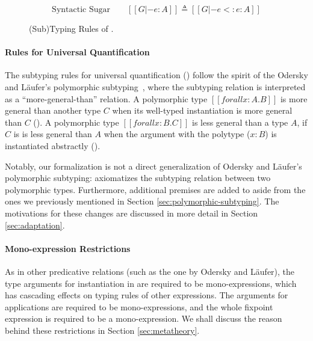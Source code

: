\begin{figure}
    \begin{equation*}
       \text{Syntactic Sugar} \qquad [[G |- e : A]] \triangleq [[G |- e <: e : A]]
    \end{equation*}
    \caption{(Sub)Typing Rules of \name.}
    \label{fig:typing}
\end{figure}

\paragraph{Rules for Universal Quantification}
The subtyping rules for universal quantification () follow
the spirit of the Odersky and L\"aufer's polymorphic subtyping~\cite{odersky1996putting,dunfield2013complete},
where the subtyping relation is interpreted as a ``more-general-than'' relation.
A polymorphic type $[[forall x : A. B]]$
is more general than another type $C$ when its well-typed
instantiation is more general than $C$ (). A polymorphic
type $[[forall x : B. C]]$ is less general than a type $A$,
if $C$ is is less general than $A$ when the argument with the polytype ($x:B$)
is instantiated abstractly ().

Notably, our formalization is not a direct generalization of Odersky and L\"aufer's
polymorphic subtyping:
 axiomatizes the subtyping relation between two polymorphic types.
Furthermore, additional premises are added to  aside from the
ones we previously mentioned in Section \ref{sec:polymorphic-subtyping}.
The motivations for these changes are discussed in more detail in Section \ref{sec:adaptation}.

\paragraph{Mono-expression Restrictions}
As in other predicative relations (such as the one by Odersky and L\"aufer),
the type arguments for instantiation in  are
required to be mono-expressions, which has cascading effects on typing rules of
other expressions. The arguments for applications are required to be
mono-expressions, and the whole fixpoint expression is required to be a
mono-expression. We shall
discuss the reason behind these restrictions in Section \ref{sec:metatheory}.

